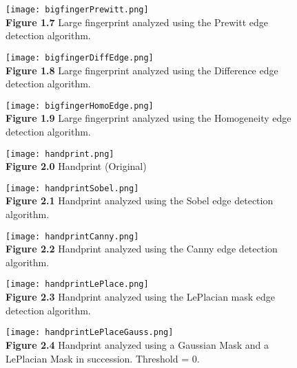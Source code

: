\documentclass{article}%
\begin{document}
\newpage
\begin{figure}[h]
\centering
\texttt{[image: bigfingerPrewitt.png]}\\
{\bf Figure 1.7} Large fingerprint analyzed using the Prewitt edge detection algorithm.  
\end{figure}  
  
\newpage
\begin{figure}[h]
\centering
\texttt{[image: bigfingerDiffEdge.png]}\\
{\bf Figure 1.8} Large fingerprint analyzed using the Difference edge detection algorithm.  
\end{figure}    

\newpage
\begin{figure}[h]
\centering
\texttt{[image: bigfingerHomoEdge.png]}\\  
{\bf Figure 1.9} Large fingerprint analyzed using the Homogeneity edge detection algorithm.  
\end{figure}  
 
\clearpage

\newpage
\begin{figure}[h]
\centering
\texttt{[image: handprint.png]}\\
{\bf Figure 2.0} Handprint (Original)
\end{figure}

\newpage
\begin{figure}[h]
\centering
\texttt{[image: handprintSobel.png]}\\
{\bf Figure 2.1} Handprint analyzed using the Sobel edge detection algorithm.   
\end{figure}    
 
\newpage
\begin{figure}[h]
\centering
\texttt{[image: handprintCanny.png]}\\  
{\bf Figure 2.2} Handprint analyzed using the Canny edge detection algorithm.   
\end{figure}  
  
\newpage
\begin{figure}[h]
\centering
\texttt{[image: handprintLePlace.png]}\\
{\bf Figure 2.3} Handprint analyzed using the LePlacian mask edge detection algorithm.    
\end{figure}  
 
\newpage
\begin{figure}[h]
\centering
\texttt{[image: handprintLePlaceGauss.png]}\\
{\bf Figure 2.4} Handprint analyzed using a Gaussian Mask and a LePlacian Mask in succession. Threshold = 0.   
\end{figure}  
\end{document}

